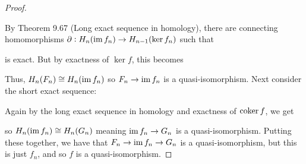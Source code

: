 \documentclass[11pt,oneside,english]{amsart}
\theoremstyle{definition}
\newcommand{\im}{\text{im\,}}
\newcommand{\coker}{\text{coker\,}}
\begin{document}
\begin{enumerate}[leftmargin=*]
\begin{proof}
\begin{center}
\end{center}
By Theorem 9.67 (Long exact sequence in homology), there are connecting homomorphisms $\partial:H_n(\im f_n)\to H_{n-1}(\ker f_n)$ such that 
\begin{center}
\end{center}
is exact. But by exactness of $\ker f$, this becomes
\begin{center}
\end{center}
Thus, $H_n(F_n)\cong H_n(\im f_n)$ so $F_n\to \im f_n$ is a quasi-isomorphism. Next consider the short exact sequence:
\begin{center}
\end{center}
Again by the long exact sequence in homology and exactness of $\coker f$, we get
\begin{center}
\end{center}
so $H_n(\im f_n)\cong H_n(G_n)$ meaning $\im f_n \to G_n$ is a quasi-isomorphism. Putting these together, we have that $F_n\to\im f_n\to G_n$ is a quasi-isomorphism, but this is just $f_n$, and so $f$ is a quasi-isomorphism.
\end{proof}


\end{enumerate}
\end{document}
